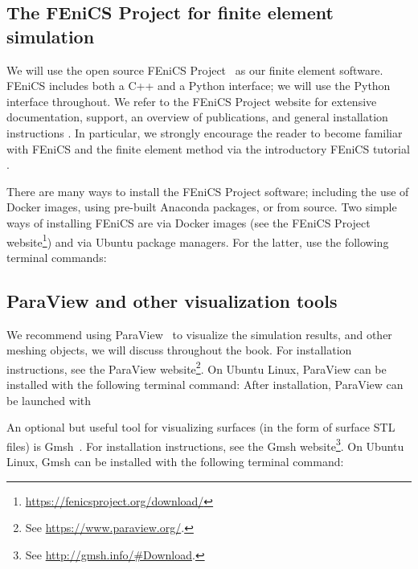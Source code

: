 \subsection{The FEniCS Project for finite element simulation}
\label{sec:chp2:tools:fenics}

We will use the open source FEniCS Project~\cite{alnaes2015fenics,
  logg2012automated} as our finite element software. FEniCS
includes both a C++ and a Python interface; we will use the Python
interface throughout. We refer to the FEniCS Project website for
extensive documentation, support, an overview of publications, and general
installation instructions \cite{fenicsproject}. In particular, we
strongly encourage the reader to become familiar with FEniCS and the finite
element method via the introductory FEniCS tutorial
\cite{langtangen2016solving}.

There are many ways to install the FEniCS Project software; including
the use of Docker images, using pre-built Anaconda packages, or from
source. Two simple ways of installing FEniCS are via Docker
images (see the FEniCS Project
website\footnote{\url{https://fenicsproject.org/download/}}) and via Ubuntu
package managers. For the latter, use the following terminal commands:


\subsection{ParaView and other visualization tools}
\label{sec:chp2:paraview}

We recommend using ParaView~\cite{ahrens2005paraview} to visualize the 
simulation results, and other meshing objects, we will discuss throughout the 
book.  For installation instructions, see the
ParaView website\footnote{See \url{https://www.paraview.org/}.}. On Ubuntu
Linux, ParaView can be installed with the following
terminal command:
\noindent After installation, ParaView can be launched with

An optional but useful tool for visualizing surfaces (in the form
of surface STL files) is Gmsh~\cite{geuzaine2009gmsh}. For installation
instructions, see the Gmsh
website\footnote{See \url{http://gmsh.info/\#Download}.}. On Ubuntu Linux,
Gmsh can be installed with the following terminal command:

